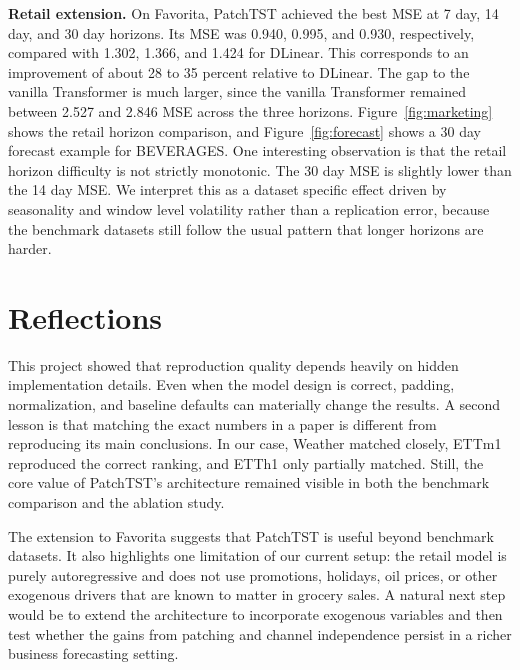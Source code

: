 \documentclass[11pt]{article}
\begin{document}
\textbf{Retail extension.} On Favorita, PatchTST achieved the best MSE at 7 day, 14 day, and 30 day horizons. Its MSE was 0.940, 0.995, and 0.930, respectively, compared with 1.302, 1.366, and 1.424 for DLinear. This corresponds to an improvement of about 28 to 35 percent relative to DLinear. The gap to the vanilla Transformer is much larger, since the vanilla Transformer remained between 2.527 and 2.846 MSE across the three horizons. Figure~\ref{fig:marketing} shows the retail horizon comparison, and Figure~\ref{fig:forecast} shows a 30 day forecast example for BEVERAGES. One interesting observation is that the retail horizon difficulty is not strictly monotonic. The 30 day MSE is slightly lower than the 14 day MSE. We interpret this as a dataset specific effect driven by seasonality and window level volatility rather than a replication error, because the benchmark datasets still follow the usual pattern that longer horizons are harder.

\section{Reflections}

This project showed that reproduction quality depends heavily on hidden implementation details. Even when the model design is correct, padding, normalization, and baseline defaults can materially change the results. A second lesson is that matching the exact numbers in a paper is different from reproducing its main conclusions. In our case, Weather matched closely, ETTm1 reproduced the correct ranking, and ETTh1 only partially matched. Still, the core value of PatchTST's architecture remained visible in both the benchmark comparison and the ablation study.

The extension to Favorita suggests that PatchTST is useful beyond benchmark datasets. It also highlights one limitation of our current setup: the retail model is purely autoregressive and does not use promotions, holidays, oil prices, or other exogenous drivers that are known to matter in grocery sales. A natural next step would be to extend the architecture to incorporate exogenous variables and then test whether the gains from patching and channel independence persist in a richer business forecasting setting.
\end{document}
